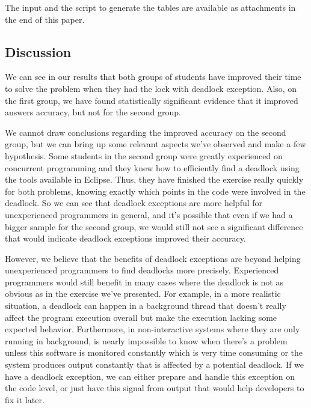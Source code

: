 The input and the script to generate the tables are available as attachments in the end of this paper.


\subsection{Discussion}


We can see in our results that both groups of students have improved their time to solve the problem when they had the lock with deadlock exception. Also, on the first group, we have found statistically significant evidence that it improved answers accuracy, but not for the second group.

We cannot draw conclusions regarding the improved accuracy on the second group, but we can bring up some relevant aspects we've observed and make a few hypothesis. Some students in the second group were greatly experienced on concurrent programming and they knew how to efficiently find a deadlock using the tools available in Eclipse. Thus, they have finished the exercise really quickly for both problems, knowing exactly which points in the code were involved in the deadlock. So we can see that deadlock exceptions are more helpful for unexperienced programmers in general, and it's possible that even if we had a bigger sample for the second group, we would still not see a significant difference that would indicate deadlock exceptions improved their accuracy.

However, we believe that the benefits of deadlock exceptions are beyond helping unexperienced programmers to find deadlocks more precisely. Experienced programmers would still benefit in many cases where the deadlock is not as obvious as in the exercise we've presented. For example, in a more realistic situation, a deadlock can happen in a background thread that doesn't really affect the program execution overall but make the execution lacking some expected behavior. Furthermore, in non-interactive systems where they are only running in background, is nearly impossible to know when there's a problem unless this software is monitored constantly which is very time consuming or the system produces output constantly that is affected by a potential deadlock. If we have a deadlock exception, we can either prepare and handle this exception on the code level, or just have this signal from output that would help developers to fix it later.

